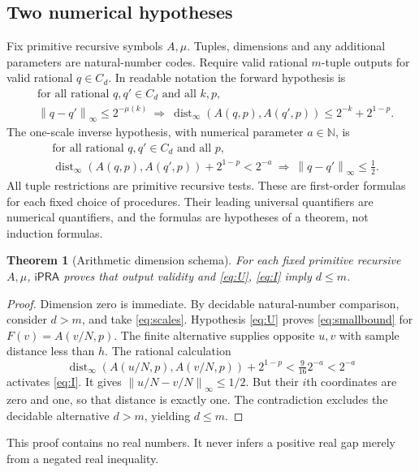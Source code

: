 \documentclass[11pt,a4paper]{article}
\newtheorem{theorem}{Theorem}[section]
\theoremstyle{definition}
\newcommand{\N}{\mathbb N}\newcommand{\Z}{\mathbb Z}
\newcommand{\ipra}{\mathsf{iPRA}}
\newcommand{\dist}{\operatorname{dist}_{\infty}}
\newcommand{\norm}[1]{\left\lVert #1\right\rVert_{\infty}}
\begin{document}
\subsection{Two numerical hypotheses}
Fix primitive recursive symbols $A,\mu$. Tuples, dimensions
and any additional parameters are natural-number codes.
Require valid rational $m$-tuple outputs for valid rational
$q\in C_d$. In readable notation the forward hypothesis is
\begin{equation}\label{eq:U}
\begin{split}
 &\text{for all rational }q,q'\in C_d\text{ and all }k,p,\\
 &\norm{q-q'}\leq2^{-\mu(k)}
 \ \Longrightarrow\
 \dist(A(q,p),A(q',p))\leq2^{-k}+2^{1-p}.
\end{split}
\end{equation}
The one-scale inverse hypothesis, with numerical parameter
$a\in\N$, is
\begin{equation}\label{eq:I}
\begin{split}
 &\text{for all rational }q,q'\in C_d\text{ and all }p,\\
 &\dist(A(q,p),A(q',p))+2^{1-p}<2^{-a}
 \ \Longrightarrow\
 \norm{q-q'}\leq\tfrac12.
\end{split}
\end{equation}
All tuple restrictions are primitive recursive tests.
These are first-order formulas for each fixed choice of
procedures. Their leading universal quantifiers are numerical
quantifiers, and the formulas are hypotheses of a theorem,
not induction formulas.

\begin{theorem}[Arithmetic dimension schema]\label{thm:schema}
For each fixed primitive recursive $A,\mu$, $\ipra$ proves
that output validity and \eqref{eq:U}, \eqref{eq:I} imply
$d\leq m$.
\end{theorem}
\begin{proof}
Dimension zero is immediate. By decidable natural-number
comparison, consider $d>m$, and take \eqref{eq:scales}.
Hypothesis \eqref{eq:U} proves \eqref{eq:smallbound} for
$F(v)=A(v/N,p)$. The finite alternative supplies opposite
$u,v$ with sample distance less than $h$. The rational
calculation
\[
 \dist(A(u/N,p),A(v/N,p))+2^{1-p}
           <\tfrac{9}{16}2^{-a}<2^{-a}
\]
activates \eqref{eq:I}. It gives $\norm{u/N-v/N}\leq1/2$.
But their $i$th coordinates are zero and one, so that
distance is exactly one. The contradiction excludes the
decidable alternative $d>m$, yielding $d\leq m$.
\end{proof}
This proof contains no real numbers. It never infers a
positive real gap merely from a negated real inequality.
\end{document}
